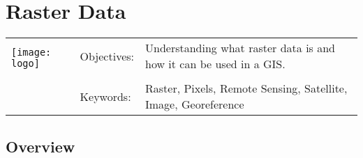 

\section{Raster Data}\label{sec:rasterdata}
\begin{tabular}{p{3.5cm}p{6cm}p{6cm}}
\multirow{2}{*}{\texttt{[image: logo]}} & Objectives: &
Understanding what raster data is and how it can be used in a GIS. \\
& & \\
& Keywords: & 
Raster, Pixels, Remote Sensing, Satellite, Image, Georeference  \\
\hline
\end{tabular}

\subsection{Overview}\label{subsec:overview}






